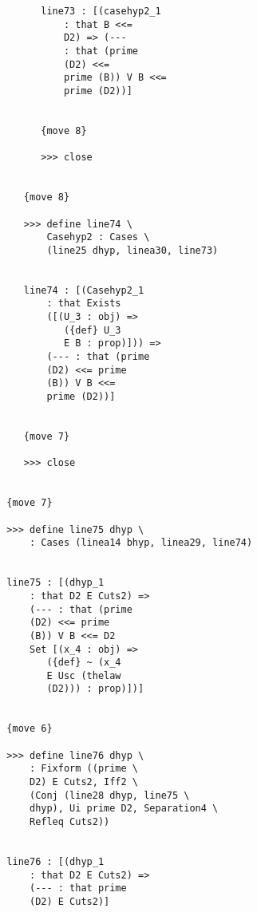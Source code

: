 \documentclass[12pt]{article}
\begin{document}
\begin{verbatim}
                           line73 : [(casehyp2_1 
                               : that B <<= 
                               D2) => (--- 
                               : that (prime 
                               (D2) <<= 
                               prime (B)) V B <<= 
                               prime (D2))]


                           {move 8}

                           >>> close


                        {move 8}

                        >>> define line74 \
                            Casehyp2 : Cases \
                            (line25 dhyp, linea30, line73)


                        line74 : [(Casehyp2_1 
                            : that Exists 
                            ([(U_3 : obj) => 
                               ({def} U_3 
                               E B : prop)])) => 
                            (--- : that (prime 
                            (D2) <<= prime 
                            (B)) V B <<= 
                            prime (D2))]


                        {move 7}

                        >>> close


                     {move 7}

                     >>> define line75 dhyp \
                         : Cases (linea14 bhyp, linea29, line74)


                     line75 : [(dhyp_1 
                         : that D2 E Cuts2) => 
                         (--- : that (prime 
                         (D2) <<= prime 
                         (B)) V B <<= D2 
                         Set [(x_4 : obj) => 
                            ({def} ~ (x_4 
                            E Usc (thelaw 
                            (D2))) : prop)])]


                     {move 6}

                     >>> define line76 dhyp \
                         : Fixform ((prime \
                         D2) E Cuts2, Iff2 \
                         (Conj (line28 dhyp, line75 \
                         dhyp), Ui prime D2, Separation4 \
                         Refleq Cuts2))


                     line76 : [(dhyp_1 
                         : that D2 E Cuts2) => 
                         (--- : that prime 
                         (D2) E Cuts2)]



\end{verbatim}
\end{document}

